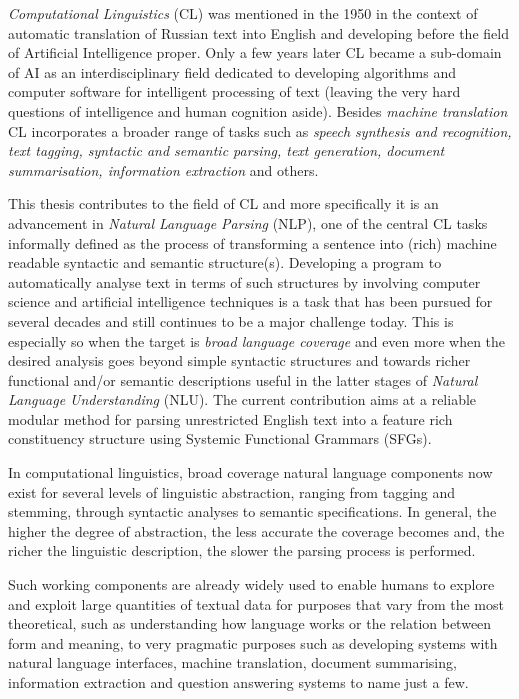 \textit{Computational Linguistics} (CL) was mentioned in the 1950 in the context of automatic translation \citep{Hutchins1999} of Russian text into English and developing before the field of Artificial Intelligence proper. Only a few years later CL became a sub-domain of AI as an interdisciplinary field dedicated to developing algorithms and computer software for intelligent processing of text (leaving the very hard questions of intelligence and human cognition aside). Besides \textit{machine translation} CL incorporates a broader range of tasks such as \textit{speech synthesis and recognition, text tagging, syntactic and semantic parsing, text generation, document summarisation, information extraction} and others. 

This thesis contributes to the field of CL and more specifically it is an advancement in \textit{Natural Language Parsing} (NLP), one of the central CL tasks informally defined as the process of transforming a sentence into (rich) machine readable syntactic and semantic structure(s). Developing a program to automatically analyse text in terms of such structures by involving computer science and artificial intelligence techniques is a task that has been pursued for several decades and still continues to be a major challenge today. This is especially so when the target is \textit{broad language coverage} and even more when the desired analysis goes beyond simple syntactic structures and towards richer functional and/or semantic descriptions useful in the latter stages of \textit{Natural Language Understanding} (NLU). The current contribution aims at a reliable modular method for parsing unrestricted English text into a feature rich constituency structure using Systemic Functional Grammars (SFGs). 

In computational linguistics, broad coverage natural language components now exist for several levels of linguistic abstraction, ranging from tagging and stemming, through syntactic analyses to semantic specifications. In general, the higher the degree of abstraction, the less accurate the coverage becomes and, the richer the linguistic description, the slower the parsing process is performed. 

Such working components are already widely used to enable humans to explore and exploit large quantities of textual data for purposes that vary from the most theoretical, such as understanding how language works or the relation between form and meaning, to very pragmatic purposes such as developing systems with natural language interfaces, machine translation, document summarising, information extraction and question answering systems to name just a few. 

